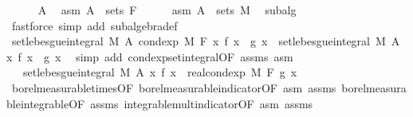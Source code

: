 \begin{isabellebody}
\isanewline
\ \ \ \ \isamarkupfalse%
\ A\ \isamarkupfalse%
\ asm{\isacharcolon}{\kern0pt}\ {\isachardoublequoteopen}A\ {\isasymin}\ sets\ F{\isachardoublequoteclose}\isanewline
\ \ \ \ \isamarkupfalse%
\ asm{\isacharprime}{\kern0pt}{\isacharcolon}{\kern0pt}\ {\isachardoublequoteopen}A\ {\isasymin}\ sets\ M{\isachardoublequoteclose}\ \isamarkupfalse%
\ subalg\ \isamarkupfalse%
\ {\isacharparenleft}{\kern0pt}fastforce\ simp\ add{\isacharcolon}{\kern0pt}\ subalgebra{\isacharunderscore}{\kern0pt}def{\isacharparenright}{\kern0pt}\isanewline
\ \ \ \ \isamarkupfalse%
\ {\isachardoublequoteopen}set{\isacharunderscore}{\kern0pt}lebesgue{\isacharunderscore}{\kern0pt}integral\ M\ A\ {\isacharparenleft}{\kern0pt}cond{\isacharunderscore}{\kern0pt}exp\ M\ F\ {\isacharparenleft}{\kern0pt}{\isasymlambda}x{\isachardot}{\kern0pt}\ f\ x\ {\isacharasterisk}{\kern0pt}\ g\ x{\isacharparenright}{\kern0pt}{\isacharparenright}{\kern0pt}\ {\isacharequal}{\kern0pt}\ set{\isacharunderscore}{\kern0pt}lebesgue{\isacharunderscore}{\kern0pt}integral\ M\ A\ {\isacharparenleft}{\kern0pt}{\isasymlambda}x{\isachardot}{\kern0pt}\ f\ x\ {\isacharasterisk}{\kern0pt}\ g\ x{\isacharparenright}{\kern0pt}{\isachardoublequoteclose}\ \isamarkupfalse%
\ {\isacharparenleft}{\kern0pt}simp\ add{\isacharcolon}{\kern0pt}\ cond{\isacharunderscore}{\kern0pt}exp{\isacharunderscore}{\kern0pt}set{\isacharunderscore}{\kern0pt}integral{\isacharbrackleft}{\kern0pt}OF\ assms{\isacharparenleft}{\kern0pt}{}{\isacharparenright}{\kern0pt}\ asm{\isacharbrackright}{\kern0pt}{\isacharparenright}{\kern0pt}\isanewline
\ \ \ \ \isamarkupfalse%
\ \isamarkupfalse%
\ {\isachardoublequoteopen}{\isachardot}{\kern0pt}{\isachardot}{\kern0pt}{\isachardot}{\kern0pt}\ {\isacharequal}{\kern0pt}\ set{\isacharunderscore}{\kern0pt}lebesgue{\isacharunderscore}{\kern0pt}integral\ M\ A\ {\isacharparenleft}{\kern0pt}{\isasymlambda}x{\isachardot}{\kern0pt}\ f\ x\ {\isacharasterisk}{\kern0pt}\ real{\isacharunderscore}{\kern0pt}cond{\isacharunderscore}{\kern0pt}exp\ M\ F\ g\ x{\isacharparenright}{\kern0pt}{\isachardoublequoteclose}\ \isamarkupfalse%
\ borel{\isacharunderscore}{\kern0pt}measurable{\isacharunderscore}{\kern0pt}times{\isacharbrackleft}{\kern0pt}OF\ borel{\isacharunderscore}{\kern0pt}measurable{\isacharunderscore}{\kern0pt}indicator{\isacharbrackleft}{\kern0pt}OF\ asm{\isacharbrackright}{\kern0pt}\ assms{\isacharparenleft}{\kern0pt}{}{\isacharparenright}{\kern0pt}{\isacharbrackright}{\kern0pt}\ borel{\isacharunderscore}{\kern0pt}measurable{\isacharunderscore}{\kern0pt}integrable{\isacharbrackleft}{\kern0pt}OF\ assms{\isacharparenleft}{\kern0pt}{}{\isacharparenright}{\kern0pt}{\isacharbrackright}{\kern0pt}\ integrable{\isacharunderscore}{\kern0pt}mult{\isacharunderscore}{\kern0pt}indicator{\isacharbrackleft}{\kern0pt}OF\ asm{\isacharprime}{\kern0pt}\ assms{\isacharparenleft}{\kern0pt}{}{\isacharparenright}{\kern0pt}{\isacharbrackright}{\kern0pt}\ \isamarkupfalse%

\end{isabellebody}
